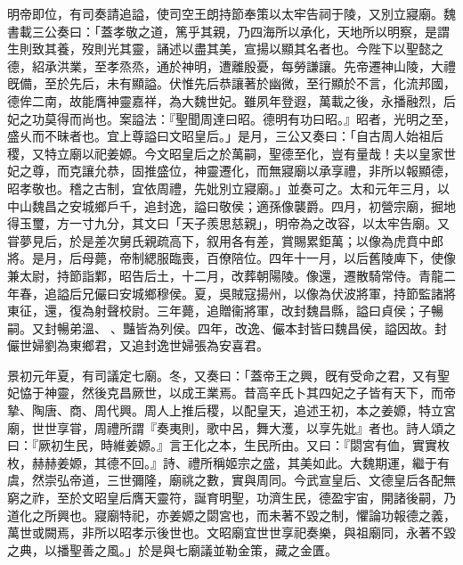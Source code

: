 \begin{pinyinscope}
明帝即位，有司奏請追謚，使司空王朗持節奉策以太牢告祠于陵，又別立寢廟。魏書載三公奏曰：「蓋孝敬之道，篤乎其親，乃四海所以承化，天地所以明察，是謂生則致其養，歿則光其靈，誦述以盡其美，宣揚以顯其名者也。今陛下以聖懿之德，紹承洪業，至孝烝烝，通於神明，遭離殷憂，每勞謙讓。先帝遷神山陵，大禮旣備，至於先后，未有顯謚。伏惟先后恭讓著於幽微，至行顯於不言，化流邦國，德侔二南，故能膺神靈嘉祥，為大魏世妃。雖夙年登遐，萬載之後，永播融烈，后妃之功莫得而尚也。案謚法：『聖聞周達曰昭。德明有功曰昭。』昭者，光明之至，盛乆而不昧者也。宜上尊謚曰文昭皇后。」是月，三公又奏曰：「自古周人始祖后稷，又特立廟以祀姜嫄。今文昭皇后之於萬嗣，聖德至化，豈有量哉！夫以皇家世妃之尊，而克讓允恭，固推盛位，神靈遷化，而無寢廟以承享禮，非所以報顯德，昭孝敬也。稽之古制，宜依周禮，先妣別立寢廟。」並奏可之。太和元年三月，以中山魏昌之安城鄉戶千，追封逸，謚曰敬侯；適孫像襲爵。四月，初營宗廟，掘地得玉璽，方一寸九分，其文曰「天子羨思慈親」，明帝為之改容，以太牢告廟。又甞夢見后，於是差次舅氏親疏高下，叙用各有差，賞賜累鉅萬；以像為虎賁中郎將。是月，后母薨，帝制緦服臨喪，百僚陪位。四年十一月，以后舊陵庳下，使像兼太尉，持節詣鄴，昭告后土，十二月，改葬朝陽陵。像還，遷散騎常侍。青龍二年春，追謚后兄儼曰安城鄉穆侯。夏，吳賊寇揚州，以像為伏波將軍，持節監諸將東征，還，復為射聲校尉。三年薨，追贈衞將軍，改封魏昌縣，謚曰貞侯；子暢嗣。又封暢弟溫、𩋾、豔皆為列侯。四年，改逸、儼本封皆曰魏昌侯，謚因故。封儼世婦劉為東鄉君，又追封逸世婦張為安喜君。

景初元年夏，有司議定七廟。冬，又奏曰：「蓋帝王之興，旣有受命之君，又有聖妃恊于神靈，然後克昌厥世，以成王業焉。昔高辛氏卜其四妃之子皆有天下，而帝摯、陶唐、商、周代興。周人上推后稷，以配皇天，追述王初，本之姜嫄，特立宮廟，世世享甞，周禮所謂『奏夷則，歌中呂，舞大濩，以享先妣』者也。詩人頌之曰：『厥初生民，時維姜嫄。』言王化之本，生民所由。又曰：『閟宮有侐，實實枚枚，赫赫姜嫄，其德不回。』詩、禮所稱姬宗之盛，其美如此。大魏期運，繼于有虞，然崇弘帝道，三世彌隆，廟祧之數，實與周同。今武宣皇后、文德皇后各配無窮之祚，至於文昭皇后膺天靈符，誕育明聖，功濟生民，德盈宇宙，開諸後嗣，乃道化之所興也。寢廟特祀，亦姜嫄之閟宮也，而未著不毀之制，懼論功報德之義，萬世或闕焉，非所以昭孝示後世也。文昭廟宜世世享祀奏樂，與祖廟同，永著不毀之典，以播聖善之風。」於是與七廟議並勒金策，藏之金匱。


\end{pinyinscope}
